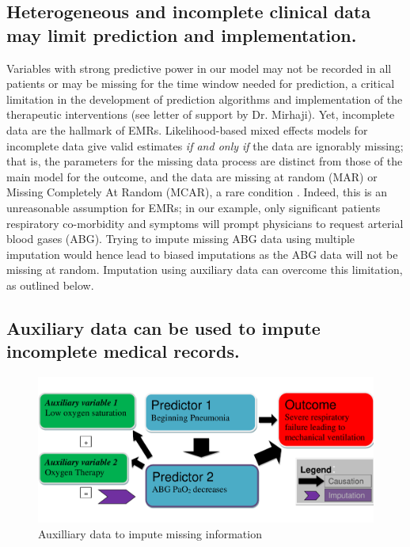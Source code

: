 \documentclass[11pt,notitlepage]{article}
\begin{document}
\subsection*{Heterogeneous and incomplete clinical data may limit prediction and implementation.}
Variables with strong predictive power in our model may not be recorded in all patients 
or may be missing for the time window needed for prediction, a critical limitation 
in the development of prediction algorithms and implementation of the 
therapeutic interventions (see letter of support by Dr. Mirhaji). 
Yet, incomplete data are the hallmark of EMRs. 
Likelihood-based mixed effects models for incomplete data give valid estimates 
\textit{if and only if } the data are ignorably missing; that is, the parameters 
for the missing data process are distinct from those of the main model for the 
outcome, and the data are missing at random (MAR) or Missing Completely At Random 
(MCAR), a rare condition \cite{Rubin1976}. Indeed, this is an unreasonable assumption 
for EMRs; in our example, only significant patients respiratory co-morbidity and 
symptoms will prompt physicians to request arterial blood gases (ABG). Trying to 
impute missing ABG data using multiple imputation would  hence lead to biased 
imputations as the ABG data will not be missing at random. Imputation using 
auxiliary data can overcome this limitation, as outlined below.

\subsection*{Auxiliary data can be used to impute incomplete medical records.} 

\begin{figure} 
 \vspace{-25pt}
 \includegraphics[scale=0.4]{Figures/Bayesian_imputation.pdf}
    \vspace{-20pt}
  \caption{Auxilliary data to impute missing information}
   \vspace{-15pt}
   \label{fig:Imputation_fig}
\end{figure}
\end{document}
